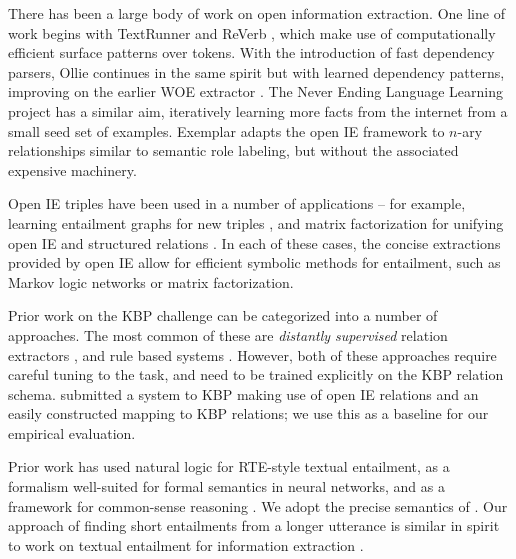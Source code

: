 There has been a large body of work on open information extraction.
One line of work begins with
  TextRunner \cite{key:2007yates-textrunner} and
  ReVerb \cite{key:2011fader-reverb}, which make use of computationally
  efficient surface patterns over tokens.
With the introduction of fast dependency parsers,
  Ollie \cite{key:2012mausam-ollie} continues in the same spirit but with
  learned dependency patterns, improving on the earlier WOE extractor
  \cite{key:2010wu-openie}.
The Never Ending Language Learning project \cite{key:2010carlson-nell}
  has a similar aim, iteratively learning more facts from the internet
  from a small seed set of examples.
Exemplar \cite{key:2013mesquita-exemplar} adapts the open IE framework to
  $n$-ary relationships similar to semantic role labeling, but without the
  associated expensive machinery.

Open IE triples have been used in a number of applications --
  for example, learning entailment graphs for new triples
  \cite{key:2011berant-entailment}, and
  matrix factorization for unifying open IE and structured relations
  \cite{key:2012yao-schemas,key:2013riedel-schemas}.
In each of these cases, the concise extractions provided by open IE allow
  for efficient symbolic methods for entailment, such as Markov logic
  networks or matrix factorization.

Prior work on the KBP challenge can be categorized into a number of approaches.
The most common of these are \textit{distantly supervised} relation extractors
  \cite{key:1999craven-distsup,key:2007wu-distsup,key:2009mintz-distsup,key:2011sun-kbp},
  and rule based systems
  \cite{key:1997soderland-kbp,key:2010grishman-kbp,key:2010chen-kbp}.
However, both of these approaches require careful tuning to the task, and
  need to be trained explicitly on the KBP relation schema.
 submitted a system to KBP making use of
  open IE relations and an easily constructed mapping to KBP relations;
  we use this as a baseline for our empirical evaluation.

Prior work has used natural logic
  for RTE-style textual entailment,
  as a formalism well-suited for formal semantics in neural networks,
  and as a framework for common-sense reasoning
  \cite{key:2009maccartney-natlog,key:2012watanabe-natlog,key:2013bowman-natlog,key:2013angeli-truth}.
We adopt the precise semantics of .
Our approach of finding short entailments from a longer utterance is similar
  in spirit to work on textual entailment for information extraction
  \cite{key:2006romano-ie}.

